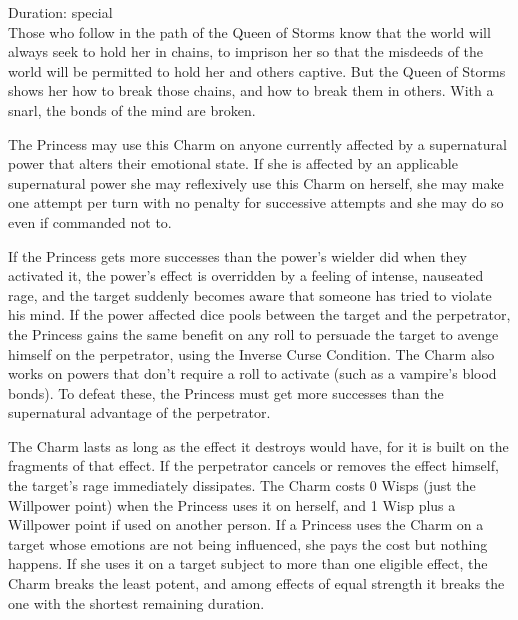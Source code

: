 \noindent Duration: special \\

\noindent Those who follow in the path of the Queen of Storms know that the world will always seek to hold her in chains, to imprison her so that the misdeeds of the world will be permitted to hold her and others captive. But the Queen of Storms shows her how to break those chains, and how to break them in others. With a snarl, the bonds of the mind are broken.

The Princess may use this Charm on anyone currently affected by a supernatural power that alters their emotional state. If she is affected by an applicable supernatural power she may reflexively use this Charm on herself, she may make one attempt per turn with no penalty for successive attempts and she may do so even if commanded not to.

If the Princess gets more successes than the power's wielder did when they activated it, the power's effect is overridden by a feeling of intense, nauseated rage, and the target suddenly becomes aware that someone has tried to violate his mind. If the power affected dice pools between the target and the perpetrator, the Princess gains the same benefit on any roll to persuade the target to avenge himself on the perpetrator, using the Inverse Curse Condition. The Charm also works on powers that don't require a roll to activate (such as a vampire's blood bonds). To defeat these, the Princess must get more successes than the supernatural advantage of the perpetrator.

The Charm lasts as long as the effect it destroys would have, for it is built on the fragments of that effect. If the perpetrator cancels or removes the effect himself, the target's rage immediately dissipates. The Charm costs 0 Wisps (just the Willpower point) when the Princess uses it on herself, and 1 Wisp plus a Willpower point if used on another person. If a Princess uses the Charm on a target whose emotions are not being influenced, she pays the cost but nothing happens. If she uses it on a target subject to more than one eligible effect, the Charm breaks the least potent, and among effects of equal strength it breaks the one with the shortest remaining duration.

